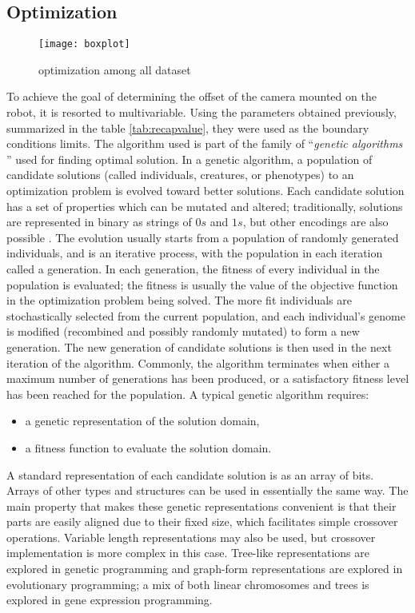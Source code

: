 \subsection{Optimization}
\begin{figure*}[htb]
\centering
\texttt{[image: boxplot]}
\caption{optimization among all dataset}
\label{fig:boxplot}
\end{figure*}
To achieve the goal of determining the offset of the camera mounted on the robot, it is resorted to multivariable.
Using the parameters obtained previously, summarized in the table \ref{tab:recapvalue}, they were used as the boundary conditions limits.
The algorithm used is part of the family of ``\emph{genetic algorithms} \cite{wiki:xxx}'' used for finding optimal solution.
In a genetic algorithm, a population of candidate solutions (called individuals, creatures, or phenotypes) to an optimization problem is evolved toward better solutions. Each candidate solution has a set of properties which can be mutated and altered; traditionally, solutions are represented in binary as strings of $0s$ and $1s$, but other encodings are also possible \cite{Whitley1994}.
The evolution usually starts from a population of randomly generated individuals, and is an iterative process, with the population in each iteration called a generation. In each generation, the fitness of every individual in the population is evaluated; the fitness is usually the value of the objective function in the optimization problem being solved. The more fit individuals are stochastically selected from the current population, and each individual's genome is modified (recombined and possibly randomly mutated) to form a new generation. The new generation of candidate solutions is then used in the next iteration of the algorithm. Commonly, the algorithm terminates when either a maximum number of generations has been produced, or a satisfactory fitness level has been reached for the population.
A typical genetic algorithm requires:
\begin{itemize}
\item a genetic representation of the solution domain,
\item a fitness function to evaluate the solution domain.
\end{itemize}
A standard representation of each candidate solution is as an array of bits\cite{Whitley1994}. Arrays of other types and structures can be used in essentially the same way. The main property that makes these genetic representations convenient is that their parts are easily aligned due to their fixed size, which facilitates simple crossover operations. Variable length representations may also be used, but crossover implementation is more complex in this case. Tree-like representations are explored in genetic programming and graph-form representations are explored in evolutionary programming; a mix of both linear chromosomes and trees is explored in gene expression programming.
